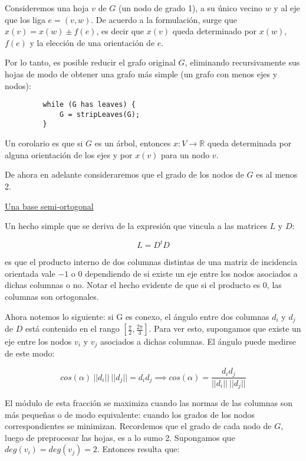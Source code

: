 \documentclass[a4paper,11pt]{article}
\begin{document}
\bigskip

Consideremos una hoja $v$ de $G$ (un nodo de grado 1), a su único 
vecino $w$ y al eje que los liga $e=(v,w)$. De acuerdo a la formulación, 
surge que $x(v) = x(w) \pm f(e)$, es decir que $x(v)$ queda 
determinado por $x(w)$, $f(e)$ y la elección de una orientación de $e$.

\bigskip

Por lo tanto, es posible reducir el grafo original $G$, eliminando 
recursivamente sus  hojas de modo de obtener una grafo más simple (un 
grafo con menos ejes y nodos):

\bigskip

\begin{verbatim}
         while (G has leaves) {
             G = stripLeaves(G);
         }
\end{verbatim}

Un corolario es que si $G$ es un árbol, entonces $x: V 
\rightarrow \mathbb{R}$ queda determinada por alguna orientación de 
los ejes y por $x(v)$ para un nodo $v$.

\bigskip

De ahora en adelante consideraremos que el grado de los nodos de $G$ es 
al menos 2.
 
\bigskip

\underline{Una base semi-ortogonal}

\bigskip

Un hecho simple que se deriva de la expresión que vincula a las matrices 
$L$ y $D$:

$$L = D^t D$$

es que el producto interno de dos columnas distintas de una matriz de 
incidencia orientada vale $-1$ o $0$ dependiendo de si existe un eje 
entre los nodos asociados a dichas columnas o no. Notar el hecho 
evidente de que si el producto es $0$, las columnas son ortogonales.

\bigskip

Ahora notemos lo siguiente: si G es conexo, el ángulo entre dos 
columnas $d_i$ y $d_j$ de $D$ está contenido en el rango 
$[\frac{\pi}{2},\frac{2\pi}{3}]$. Para ver esto, supongamos que existe 
un eje entre los nodos $v_i$ y $v_j$ asociados a dichas columnas. 
El ángulo puede medirse de este modo:

$$cos(\alpha) \ ||d_i|| \ ||d_j||= d_i  d_j \implies cos(\alpha) = 
\frac{d_i d_j}{||d_i|| \ ||d_j||}$$

El módulo de esta fracción se maximiza cuando las normas de las columnas
 son más pequeñas o de modo equivalente: cuando los grados de los nodos 
 correspondientes se minimizan. Recordemos que el grado de cada nodo de 
 $G$, luego de preprocesar las hojas, es a lo sumo 2. Supongamos que  
 $deg(v_i) = deg(v_j) = 2$. Entonces resulta que:
\end{document}
